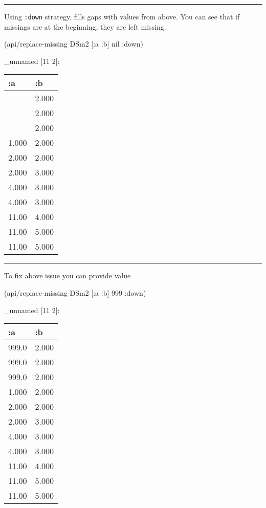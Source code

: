 \documentclass[]{article}
\newenvironment{Shaded}{\begin{snugshade}}{\end{snugshade}}
\newcommand{\DecValTok}[1]{\textcolor[rgb]{0.00,0.00,0.81}{#1}}
\newcommand{\VariableTok}[1]{\textcolor[rgb]{0.00,0.00,0.00}{#1}}
\newcommand{\AttributeTok}[1]{\textcolor[rgb]{0.77,0.63,0.00}{#1}}
\newcommand{\NormalTok}[1]{#1}
\begin{document}
\begin{center}\rule{0.5\linewidth}{0.5pt}\end{center}

Using \texttt{:down} strategy, fills gaps with values from above. You
can see that if missings are at the beginning, they are left missing.

\begin{Shaded}
\begin{Highlighting}[]
\NormalTok{(api/replace-missing DSm2 [}\AttributeTok{:a} \AttributeTok{:b}\NormalTok{] }\VariableTok{nil} \AttributeTok{:down}\NormalTok{)}
\end{Highlighting}
\end{Shaded}

\_unnamed {[}11 2{]}:

\begin{longtable}[]{@{}ll@{}}
\toprule
:a & :b\tabularnewline
\midrule
\endhead
& 2.000\tabularnewline
& 2.000\tabularnewline
& 2.000\tabularnewline
1.000 & 2.000\tabularnewline
2.000 & 2.000\tabularnewline
2.000 & 3.000\tabularnewline
4.000 & 3.000\tabularnewline
4.000 & 3.000\tabularnewline
11.00 & 4.000\tabularnewline
11.00 & 5.000\tabularnewline
11.00 & 5.000\tabularnewline
\bottomrule
\end{longtable}

\begin{center}\rule{0.5\linewidth}{0.5pt}\end{center}

To fix above issue you can provide value

\begin{Shaded}
\begin{Highlighting}[]
\NormalTok{(api/replace-missing DSm2 [}\AttributeTok{:a} \AttributeTok{:b}\NormalTok{] }\DecValTok{999} \AttributeTok{:down}\NormalTok{)}
\end{Highlighting}
\end{Shaded}

\_unnamed {[}11 2{]}:

\begin{longtable}[]{@{}ll@{}}
\toprule
:a & :b\tabularnewline
\midrule
\endhead
999.0 & 2.000\tabularnewline
999.0 & 2.000\tabularnewline
999.0 & 2.000\tabularnewline
1.000 & 2.000\tabularnewline
2.000 & 2.000\tabularnewline
2.000 & 3.000\tabularnewline
4.000 & 3.000\tabularnewline
4.000 & 3.000\tabularnewline
11.00 & 4.000\tabularnewline
11.00 & 5.000\tabularnewline
11.00 & 5.000\tabularnewline
\bottomrule
\end{longtable}
\end{document}
